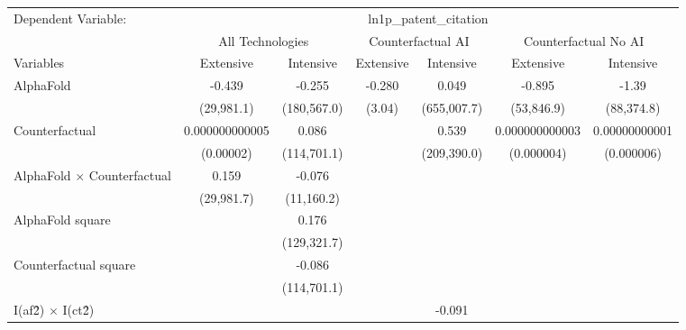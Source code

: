 \begingroup
\centering
\begin{tabular}{lcccccc}
   \tabularnewline \midrule \midrule
   Dependent Variable: & \multicolumn{6}{c}{ln1p\_patent\_citation}\\
 & \multicolumn{2}{c}{All Technologies} & \multicolumn{2}{c}{Counterfactual AI} & \multicolumn{2}{c}{Counterfactual No AI} \\
\cmidrule(lr){1-1}\cmidrule(lr){2-3} \cmidrule(lr){4-5} \cmidrule(lr){6-7}
Variables & \multicolumn{1}{c}{Extensive} & \multicolumn{1}{c}{Intensive} & \multicolumn{1}{c}{Extensive} & \multicolumn{1}{c}{Intensive} & \multicolumn{1}{c}{Extensive} & \multicolumn{1}{c}{Intensive} \\
\cmidrule(lr){1-1}\cmidrule(lr){2-2} \cmidrule(lr){3-3} \cmidrule(lr){4-4} \cmidrule(lr){5-5} \cmidrule(lr){6-6} \cmidrule(lr){7-7}
   AlphaFold                          & -0.439         & -0.255      & -0.280 & 0.049       & -0.895         & -1.39\\   
                                      & (29,981.1)     & (180,567.0) & (3.04) & (655,007.7) & (53,846.9)     & (88,374.8)\\   
   Counterfactual                     & 0.000000000005 & 0.086       &        & 0.539       & 0.000000000003 & 0.00000000001\\   
                                      & (0.00002)      & (114,701.1) &        & (209,390.0) & (0.000004)     & (0.000006)\\   
   AlphaFold $\times$ Counterfactual  & 0.159          & -0.076      &        &             &                &   \\   
                                      & (29,981.7)     & (11,160.2)  &        &             &                &   \\   
   AlphaFold square                   &                & 0.176       &        &             &                &   \\   
                                      &                & (129,321.7) &        &             &                &   \\   
   Counterfactual square              &                & -0.086      &        &             &                &   \\   
                                      &                & (114,701.1) &        &             &                &   \\   
   I(af\^2) $\times$ I(ct\^2)         &                &             &        & -0.091      &                &   \\   

\end{tabular}
